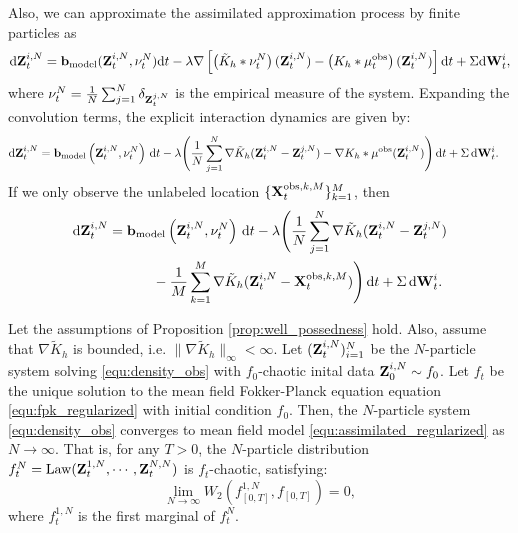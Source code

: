 Also, we can approximate the assimilated approximation process by finite particles as
$$\mathrm{d} \mathbf{Z}^{i,N}_t = \mathbf{b}_{\mathrm{model}}(\mathbf{Z}^{i,N}_t, \nu^N_t) \mathrm{d} t
-  \lambda \nabla \left[ \left(\tilde  K_h * \nu^N_t\right)(\mathbf{Z}^{i,N}_t) -\left( K_h * \mu^{\mathrm{obs}}_t\right)(\mathbf{Z}^{i,N}_t) \right] \mathrm{d} t
+ \Sigma \mathrm{d} \mathbf{W}^i_t,
$$
where $\nu^N_t = \frac{1}{N}\sum_{j=1}^N \delta_{\mathbf{Z}^{j,N}_t}$ is the empirical measure of the system. Expanding the convolution terms, the explicit interaction dynamics are given by:
\begin{equation}\label{equ:density_obs}
\begin{aligned}
\mathrm{d} \mathbf{Z}^{i,N}_t
&= \mathbf{b}_{\mathrm{model}}\left(\mathbf{Z}^{i,N}_t, \nu^N_t \right)\,\mathrm{d} t-  \lambda\Bigg(\frac{1}{N}\sum_{j=1}^N \nabla \tilde  K_h(\mathbf{Z}^{i,N}_t - \mathbf{Z}^{j,N}_t)  -  \nabla   K_h *\mu^{\mathrm{obs}} (\mathbf{Z}^{i,N}_t)\Bigg)\,\mathrm{d} t  + \Sigma \,\mathrm{d} \mathbf{W}^i_t.
\end{aligned}
\end{equation}
If we only observe the unlabeled  location $\{\mathbf{X}_t^{\mathrm{obs},k,M}\}_{k=1}^M$, then
\begin{equation}\label{equ:location_obs}
\begin{aligned}
\mathrm{d} \mathbf{Z}^{i,N}_t
&= \mathbf{b}_{\mathrm{model}}\left(\mathbf{Z}^{i,N}_t, \nu^N_t \right)\,\mathrm{d} t - \lambda \Bigg(\frac{1}{N}\sum_{j=1}^N \nabla \tilde  K_h(\mathbf{Z}^{i,N}_t - \mathbf{Z}^{j,N}_t) \\
&\qquad\quad\, - \frac{1}{M}\sum_{k=1}^M \nabla   \tilde K_h(\mathbf{Z}^{i,N}_t - \mathbf{X}_t^{\mathrm{obs},k,M})\Bigg)\,\mathrm{d} t + \Sigma \,\mathrm{d} \mathbf{W}^i_t.
\end{aligned}
\end{equation}
\begin{proposition}
    Let the assumptions of Proposition \ref{prop:well_possedness} hold. Also, assume that $\nabla \tilde{K}_h$ is bounded, i.e. $\|\nabla \tilde{K}_h\|_\infty < \infty$. Let $(\mathbf{Z}_t^{i,N})_{i=1}^N$ be the $N$-particle system solving \eqref{equ:density_obs} with $f_0$-chaotic inital data $\mathbf{Z}_0^{i,N}\sim f_0$. Let $f_t$ be the unique solution to the mean field Fokker-Planck equation equation \eqref{equ:fpk_regularized} with initial condition $f_0$. Then, the $N$-particle system \eqref{equ:density_obs} converges to mean field model \eqref{equ:assimilated_regularized} as $N\to \infty$. That is, for any $T>0$, the $N$-particle distribution $f_t^N= \mathrm{Law}(\mathbf{Z}_t^{1,N},\cdots,\mathbf{Z}_t^{N,N})$ is $f_t$-chaotic, satisfying:
    \[
    \lim_{N\to\infty} W_2\left(f_{[0,T]}^{1,N},f_{[0,T]}\right) = 0,
    \]
    where $f_t^{1,N}$ is the first marginal of $f_t^N$.
\end{proposition}
